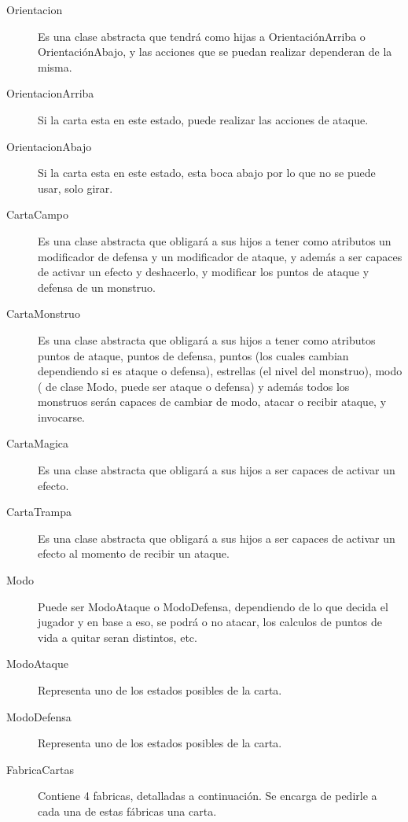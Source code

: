 \begin{description}
\item[Orientacion] Es una clase abstracta que tendrá como hijas a OrientaciónArriba o OrientaciónAbajo, y las acciones que se puedan realizar dependeran de la misma.

\item[OrientacionArriba] Si la carta esta en este estado, puede realizar las acciones de ataque. 

\item[OrientacionAbajo] Si la carta esta en este estado, esta boca abajo por lo que no se puede usar, solo girar.

\item[CartaCampo] Es una clase abstracta que obligará a sus hijos a tener como atributos un modificador de defensa y un modificador de ataque, y además a ser capaces de activar un efecto y deshacerlo, y modificar los puntos de ataque y defensa de un monstruo.

\item[CartaMonstruo] Es una clase abstracta que obligará a sus hijos a tener como atributos puntos de ataque, puntos de defensa, puntos (los cuales cambian dependiendo si es ataque o defensa), estrellas (el nivel del monstruo), modo ( de clase Modo, puede ser ataque o defensa) y además todos los monstruos serán capaces de cambiar de modo, atacar o recibir ataque, y invocarse.

\item[CartaMagica] Es una clase abstracta que obligará a sus hijos a ser capaces de activar un efecto.

\item[CartaTrampa] Es una clase abstracta que obligará a sus hijos a ser capaces de activar un efecto al momento de recibir un ataque.

\item[Modo] Puede ser ModoAtaque o ModoDefensa, dependiendo de lo que decida el jugador y en base a eso, se podrá o no atacar, los calculos de puntos de vida a quitar seran distintos, etc.

\item[ModoAtaque] Representa uno de los estados posibles de la carta.

\item[ModoDefensa] Representa uno de los estados posibles de la carta.

\item[FabricaCartas] Contiene 4 fabricas, detalladas a continuación. Se encarga de pedirle a cada una de estas fábricas una carta.


\end{description}
